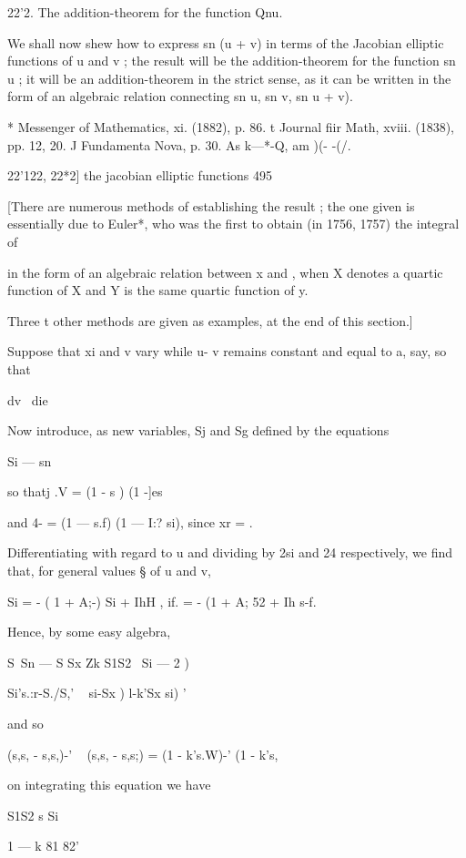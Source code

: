 22'2. The addition-theorem for the function Qnu. 

We shall now shew how to express sn (u + v) in terms of the Jacobian 
elliptic functions of u and v ; the result will be the addition-theorem for the 
function sn u ; it will be an addition-theorem in the strict sense, as it can 
be written in the form of an algebraic relation connecting sn u, sn v, sn  u + v). 

* Messenger of Mathematics, xi. (1882), p. 86. 
t Journal fiir Math, xviii. (1838), pp. 12, 20. 
J Fundamenta Nova, p. 30. As k—*-Q, am )(- -(/. 



22'122, 22*2] the jacobian elliptic functions 495 

[There are numerous methods of establishing the result ; the one given is essentially 
due to Euler*, who was the first to obtain (in 1756, 1757) the integral of 

in the form of an algebraic relation between x and  , when X denotes a quartic function 
of X and Y is the same quartic function of y. 

Three t other methods are given as examples, at the end of this section.] 

Suppose that xi and v vary while u- v remains constant and equal to a, 
say, so that 

dv \  
die 

Now introduce, as new variables, Sj and Sg defined by the equations 

Si — sn %

so thatj .V = (1 - s ) (1 -]es \ 

and 4- = (1 — s.f) (1 — I:? si), since xr = .  

Differentiating with regard to u and dividing by 2si and 24 respectively, 
we find that, for general values § of u and v, 

Si = - ( 1 + A;-) Si + IhH , if. = - (1 + A;  52 + Ih s-f. 

Hence, by some easy algebra, 

S\ Sn  — S Sx Zk S1S2 \ Si —  2 ) 

Si's.:r-S./S,' ~  si-Sx ) l-k'Sx si) ' 

and so 

(s,s, - s,s,)-' ~ (s,s, - s,s;) = (1 - k's.W)-'   (1 - k's,%

on integrating this equation we have 

S1S2 s Si   

1 — k  81 82' 

